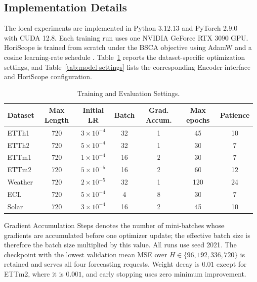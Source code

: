 \documentclass[final,3p,times]{elsarticle}
\begin{document}
\subsection{Implementation Details}


The local experiments are implemented in Python 3.12.13 and PyTorch 2.9.0 with CUDA 12.8. Each training run uses one NVIDIA GeForce RTX 3090 GPU. HoriScope is trained from scratch under the BSCA objective using AdamW and a cosine learning-rate schedule \citep{loshchilov2019adamw,loshchilov2017sgdr}. Table~\ref{tab:training-settings} reports the dataset-specific optimization settings, and Table~\ref{tab:model-settings} lists the corresponding Encoder interface and HoriScope configuration.

\begin{table}[t]
\centering
\scriptsize
\setlength{\tabcolsep}{4pt}
\caption{Training and Evaluation Settings.}
\label{tab:training-settings}
\begin{tabular}{lcccccc}
\toprule
Dataset & Max Length & Initial LR & Batch & Grad. Accum. & Max epochs & Patience \\
\midrule
ETTh1 & 720 & $3\times10^{-4}$ & 32 & 1 & 45 & 10 \\
ETTh2 & 720 & $5\times10^{-4}$ & 32 & 1 & 30 & 7 \\
ETTm1 & 720 & $1\times10^{-4}$ & 16 & 2 & 30 & 7 \\
ETTm2 & 720 & $5\times10^{-5}$ & 16 & 2 & 60 & 12 \\
Weather & 720 & $2\times10^{-5}$ & 32 & 1 & 120 & 24 \\
ECL & 720 & $5\times10^{-4}$ & 4 & 8 & 30 & 7 \\
Solar & 720 & $3\times10^{-4}$ & 16 & 2 & 45 & 10 \\
\bottomrule
\end{tabular}
\end{table}


Gradient Accumulation Steps denotes the number of mini-batches whose gradients are accumulated before one optimizer update; the effective batch size is therefore the batch size multiplied by this value. All runs use seed 2021. The checkpoint with the lowest validation mean MSE over $H\in\{96,192,336,720\}$ is retained and serves all four forecasting requests. Weight decay is $0.01$ except for ETTm2, where it is $0.001$, and early stopping uses zero minimum improvement.
\end{document}
